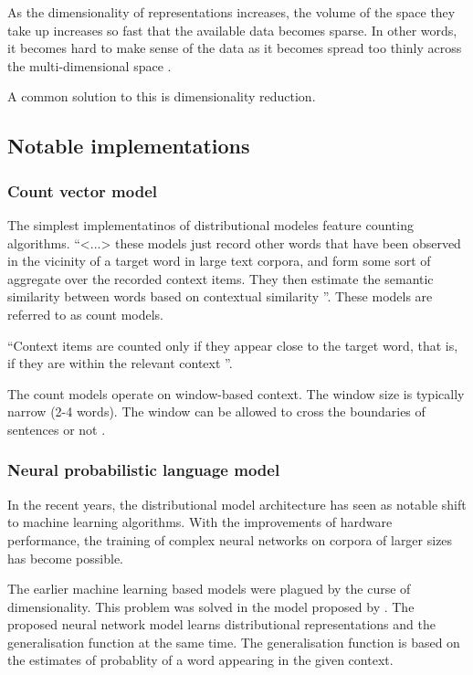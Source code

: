 \documentclass[14pt, a4paper]{extreport}
\begin{document}
As the dimensionality of representations increases, the volume of the space they take up increases so fast that the available data becomes sparse. In other words, it becomes hard to make sense of the data as it becomes spread too thinly across the multi-dimensional space \parencite{venkat}.

A common solution to this is dimensionality reduction.


\subsection{Notable implementations}

\subsubsection{Count vector model}
The simplest implementatinos of distributional modeles feature counting algorithms. ``<...> these models just record other words that have been observed in the vicinity of a target word in large text corpora, and form some sort of aggregate over the recorded context items. They then estimate the semantic similarity between words based on contextual similarity \parencite{erkkatrin2}''. These models are referred to as count models.

``Context items are counted only if they appear close to the target word, that is, if they are within the relevant context \parencite{erkkatrin2}''.

The count models operate on window-based context. The window size is typically narrow (2-4 words). The window can be allowed to cross the boundaries of sentences or not \parencite{baroni}.

\subsubsection{Neural probabilistic language model}
In the recent years, the distributional model architecture has seen as notable shift to machine learning algorithms. With the improvements of hardware performance, the training of complex neural networks on corpora of larger sizes has become possible. 

The earlier machine learning based models were plagued by the curse of dimensionality. This problem was solved in the model proposed by \parencite{bengio}. The proposed neural network model learns distributional representations and the generalisation function at the same time. The generalisation function is based on the estimates of probablity of a word appearing in the given context.
\end{document}
